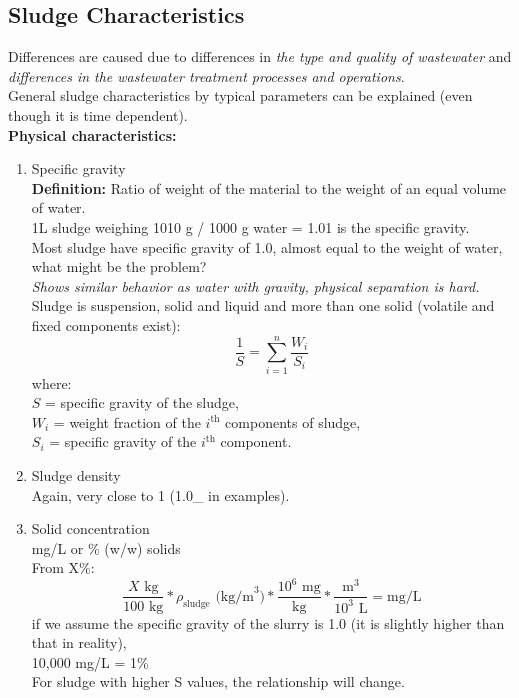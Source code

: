 \documentclass{article}
\numberwithin{equation}{section}
\begin{document}
\subsection{Sludge Characteristics}
Differences are caused due to differences in \emph{the type and quality of wastewater} and \emph{differences in the wastewater treatment processes and operations}.\\
General sludge characteristics by typical parameters can be explained (even though it is time dependent).\\
\textbf{Physical characteristics:}
\begin{enumerate}
    \item Specific gravity\\
    \textbf{Definition:} Ratio of  weight of the material to the weight of an equal volume of water.\\
    1L sludge weighing 1010 g / 1000 g water = 1.01 is the specific gravity.\\
    Most sludge have specific gravity of 1.0, almost equal to the weight of water, what might be the problem?\\
    \emph{Shows similar behavior as water with gravity, physical separation is hard.}\\
    Sludge is suspension, solid and liquid and more than one solid (volatile and fixed components exist):
    \[
    \frac{1}{S} = \sum_{i=1}^{n} \frac{W_i}{S_i}
    \]
    where:\\
    $S$ = specific gravity of the sludge,\\
    $W_i$ = weight fraction of the $i^\text{th}$ components of sludge,\\
    $S_i$ = specific gravity of the $i^\text{th}$ component.
    \item Sludge density\\
    Again, very close to 1 (1.0\_ in examples).
    \item Solid concentration\\
    mg/L or \% (w/w) solids\\
    From X\%:
    \[
    \frac{X\text{ kg}}{100\text{ kg}} * \rho_\text{sludge}\text{ (kg/m}^3\text{)} * \frac{10^6\text{ mg}}{\text{kg}} * \frac{\text{m}^3}{10^3\text{ L}} = \text{mg/L}
    \]
    if we assume the specific gravity of the slurry is 1.0 (it is slightly higher than that in reality),\\
    10,000 mg/L = 1\%\\
    For sludge with higher S values, the relationship will change.\\

\end{enumerate}
\end{document}
